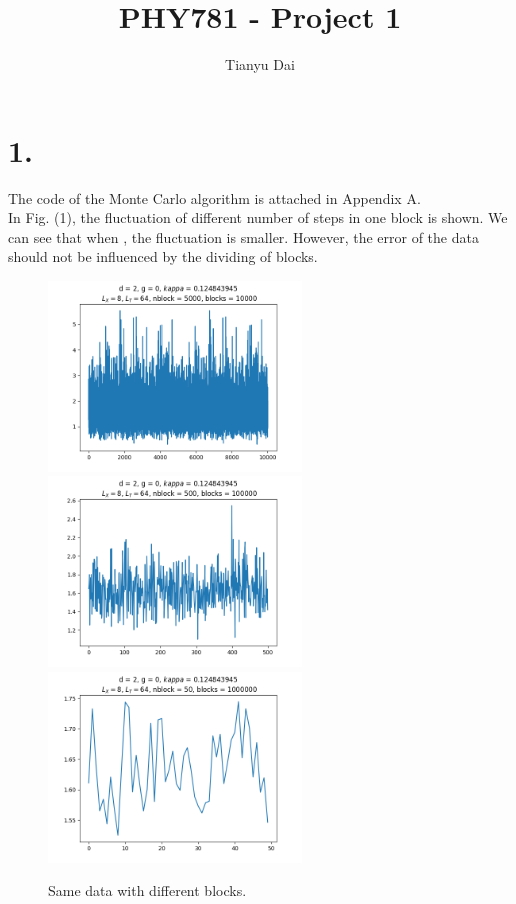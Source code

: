 \documentclass[12pt]{article}
\author{Tianyu Dai}
\title{PHY781 - Project 1}
\date{}
\begin{document}
\maketitle
\section*{1.}
The code of the Monte Carlo algorithm is attached in Appendix A. \\
In Fig. (1), the fluctuation of different number of steps in one block is shown. We can see that when , the fluctuation is smaller. However, the error of the data should not be influenced by the dividing of blocks. \\
\begin{figure}{\label{block}}
\centering
\includegraphics[width=0.6\textwidth]{2d_8-64_5000_10000.png}
\includegraphics[width=0.6\textwidth]{2d_8-64_500_100000.png}
\includegraphics[width=0.6\textwidth]{2d_8-64_50_1000000.png}
\caption{Same data with different blocks. }
\end{figure}
\end{document}
